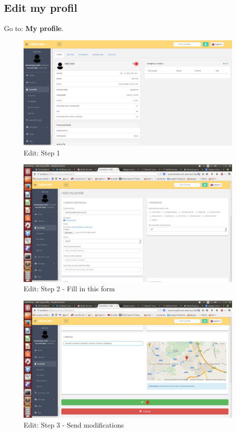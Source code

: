 \documentclass{article}
\begin{document}
\clearpage
\subsection{Edit my profil}
Go to: \textbf{My profile}.
\begin{figure}[!ht]
   \includegraphics[width=\textwidth]{img/profil4.png}
   \caption{Edit: Step 1}
\end{figure}
\begin{figure}[!ht]
   \includegraphics[width=\textwidth]{img/profil5.png}
   \caption{Edit: Step 2 - Fill in this form}
\end{figure}
\begin{figure}[!ht]
   \includegraphics[width=\textwidth]{img/profil6.png}
   \caption{Edit: Step 3 - Send modifications}
\end{figure}
\end{document}
